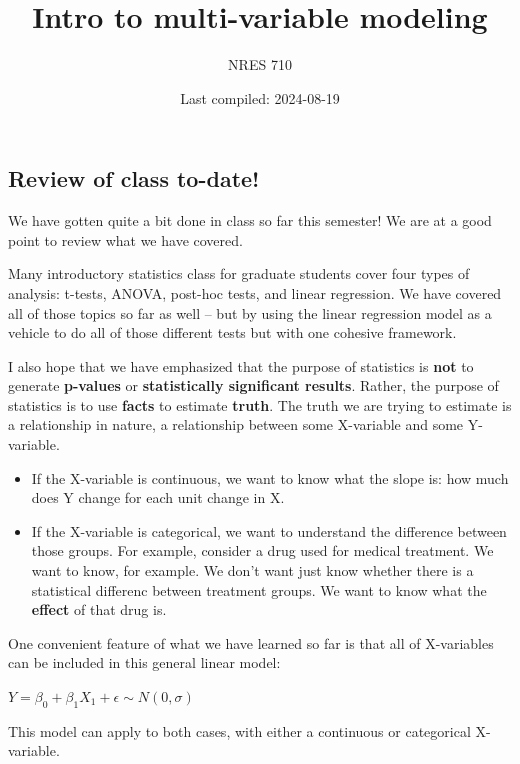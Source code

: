 \documentclass[
]{article}
\title{Intro to multi-variable modeling}
\author{NRES 710}
\date{Last compiled: 2024-08-19}
\providecommand{\tightlist}{%
  \setlength{\itemsep}{0pt}\setlength{\parskip}{0pt}}
\begin{document}
\maketitle

\subsection{Review of class to-date!}\label{review-of-class-to-date}

We have gotten quite a bit done in class so far this semester! We are at
a good point to review what we have covered.

Many introductory statistics class for graduate students cover four
types of analysis: t-tests, ANOVA, post-hoc tests, and linear
regression. We have covered all of those topics so far as well -- but by
using the linear regression model as a vehicle to do all of those
different tests but with one cohesive framework.

I also hope that we have emphasized that the purpose of statistics is
\textbf{not} to generate \textbf{p-values} or \textbf{statistically
significant results}. Rather, the purpose of statistics is to use
\textbf{facts} to estimate \textbf{truth}. The truth we are trying to
estimate is a relationship in nature, a relationship between some
X-variable and some Y-variable.

\begin{itemize}
\tightlist
\item
  If the X-variable is continuous, we want to know what the slope is:
  how much does Y change for each unit change in X.
\item
  If the X-variable is categorical, we want to understand the difference
  between those groups. For example, consider a drug used for medical
  treatment. We want to know, for example. We don't want just know
  whether there is a statistical differenc between treatment groups. We
  want to know what the \textbf{effect} of that drug is.
\end{itemize}

One convenient feature of what we have learned so far is that all of
X-variables can be included in this general linear model:

\textbf{\(Y = \beta_0 + \beta_1 X_1 + \epsilon \sim N(0, \sigma)\)}

This model can apply to both cases, with either a continuous or
categorical X-variable.
\end{document}
